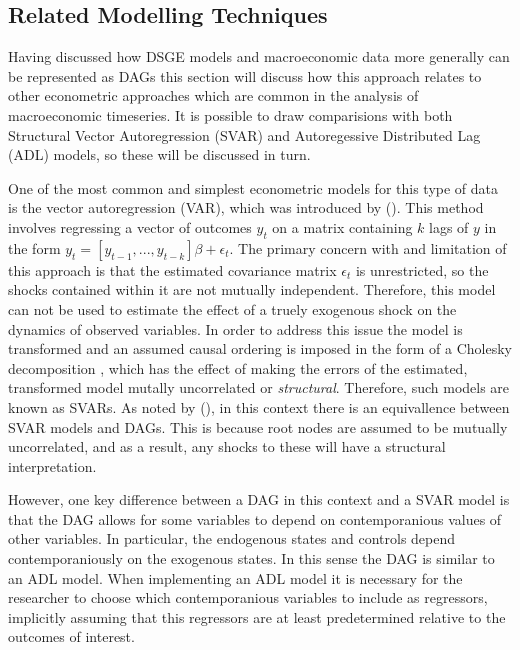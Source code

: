 \documentclass{article}
\begin{document}
\subsection{Related Modelling Techniques}

Having discussed how DSGE models and macroeconomic data more generally can be represented as DAGs this section will discuss how this approach relates to other econometric approaches which are common in the analysis of macroeconomic timeseries. It is possible to draw comparisions with both Structural Vector Autoregression (SVAR) and Autoregessive Distributed Lag (ADL) models, so these will be discussed in turn.

One of the most common and simplest econometric models for this type of data is the vector autoregression (VAR), which was introduced by \citeauthor{sims1980macroeconomics} (\citeyear{sims1980macroeconomics}). This method involves regressing a vector of outcomes $y_t$ on a matrix containing $k$ lags of $y$ in the form $y_t = [y_{t-1}, ..., y_{t-k}] \beta + \epsilon_t $. The primary concern with and limitation of this approach is that the estimated covariance matrix $\epsilon_t$ is unrestricted, so the shocks contained within it are not mutually independent. Therefore, this model can not be used to estimate the effect of a truely exogenous shock on the dynamics of observed variables. In order to address this issue the model is transformed and an assumed causal ordering is imposed in the form of a Cholesky decomposition \parencite{sims1980macroeconomics}, which has the effect of making the errors of the estimated, transformed model mutally uncorrelated or \textit{structural}. Therefore, such models are known as SVARs. As noted by \citeauthor{demiralp2003searching} (\citeyear{demiralp2003searching}), in this context there is an equivallence between SVAR models and DAGs. This is because root nodes are assumed to be mutually uncorrelated, and as a result, any shocks to these will have a structural interpretation.

However, one key difference between a DAG in this context and a SVAR model is that the DAG allows for some variables to depend on contemporanious values of other variables. In particular, the endogenous states and controls depend contemporaniously on the exogenous states. In this sense the DAG is similar to an ADL model. When implementing an ADL model it is necessary for the researcher to choose which contemporanious variables to include as regressors, implicitly assuming that this regressors are at least predetermined relative to the outcomes of interest. 
\end{document}
